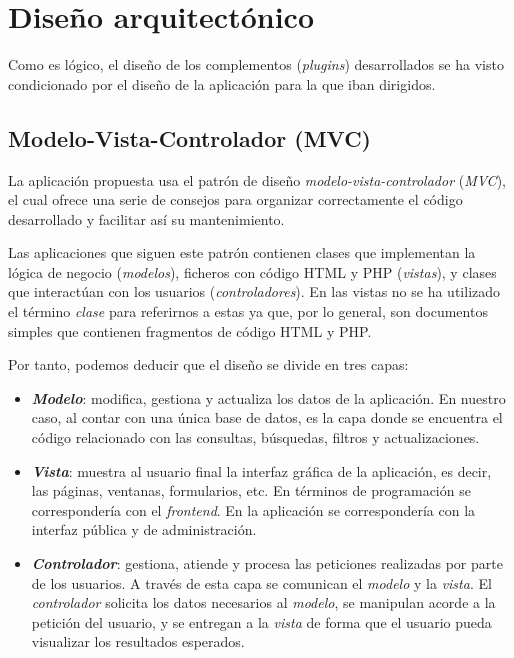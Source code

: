 
\section{Diseño arquitectónico}

Como es lógico, el diseño de los complementos (\emph{plugins})
desarrollados se ha visto condicionado por el diseño de la aplicación
para la que iban dirigidos.


\subsection{Modelo-Vista-Controlador (MVC)}

La aplicación propuesta usa el patrón de diseño
\emph{modelo-vista-controlador} (\emph{MVC}), el cual ofrece una serie
de consejos para organizar correctamente el código desarrollado y
facilitar así su mantenimiento.

Las aplicaciones que siguen este patrón contienen clases que implementan
la lógica de negocio (\emph{modelos}), ficheros con código HTML y PHP
(\emph{vistas}), y clases que interactúan con los usuarios
(\emph{controladores}). En las vistas no se ha utilizado el término
\emph{clase} para referirnos a estas ya que, por lo general, son
documentos simples que contienen fragmentos de código HTML y PHP.

Por tanto, podemos deducir que el diseño se divide en tres capas:

\begin{itemize}
\tightlist
\item
  \textbf{\emph{Modelo}}: modifica, gestiona y actualiza los datos de la
  aplicación. En nuestro caso, al contar con una única base de datos, es
  la capa donde se encuentra el código relacionado con las consultas,
  búsquedas, filtros y actualizaciones.
\item
  \textbf{\emph{Vista}}: muestra al usuario final la interfaz gráfica de la
  aplicación, es decir, las páginas, ventanas, formularios, etc. En
  términos de programación se correspondería con el \emph{frontend}. En
  la aplicación se correspondería con la interfaz pública y de
  administración.
\item
  \textbf{\emph{Controlador}}: gestiona, atiende y procesa las peticiones
  realizadas por parte de los usuarios. A través de esta capa se
  comunican el \emph{modelo} y la \emph{vista}. El \emph{controlador}
  solicita los datos necesarios al \emph{modelo}, se manipulan acorde a
  la petición del usuario, y se entregan a la \emph{vista} de forma que
  el usuario pueda visualizar los resultados esperados.
\end{itemize}

